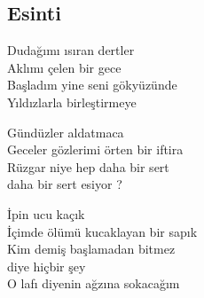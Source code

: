 \subsection{Esinti}

Dudağımı ısıran dertler \\
Aklımı çelen bir gece \\
Başladım yine seni gökyüzünde \\
Yıldızlarla birleştirmeye

\noindent\newline
Gündüzler aldatmaca \\
Geceler gözlerimi örten bir iftira \\
Rüzgar niye hep daha bir sert \\
daha bir sert esiyor ?

\noindent\newline
İpin ucu kaçık \\
İçimde ölümü kucaklayan bir sapık \\
Kim demiş başlamadan bitmez \\
diye hiçbir şey \\
O lafı diyenin ağzına sokacağım